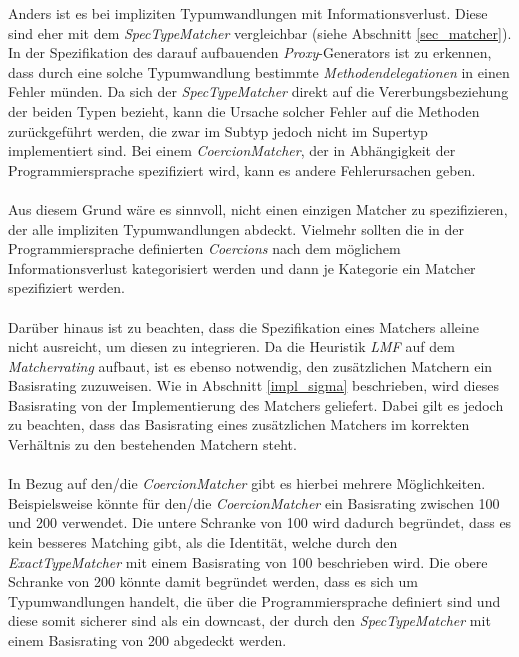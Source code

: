 Anders ist es bei impliziten Typumwandlungen mit Informationsverlust. Diese sind eher mit dem \emph{SpecTypeMatcher} vergleichbar (siehe Abschnitt \ref{sec_matcher}). In der Spezifikation des darauf aufbauenden \emph{Proxy}-Generators ist zu erkennen, dass durch eine solche Typumwandlung bestimmte \emph{Methodendelegationen} in einen Fehler münden. Da sich der \emph{SpecTypeMatcher} direkt auf die Vererbungsbeziehung der beiden Typen bezieht, kann die Ursache solcher Fehler auf die Methoden zurückgeführt werden, die zwar im Subtyp jedoch nicht im Supertyp implementiert sind. Bei einem \emph{CoercionMatcher}, der in Abhängigkeit der Programmiersprache spezifiziert wird, kann es andere Fehlerursachen geben.
\\\\
Aus diesem Grund wäre es sinnvoll, nicht einen einzigen Matcher zu spezifizieren, der alle impliziten Typumwandlungen abdeckt. Vielmehr sollten die in der Programmiersprache definierten \emph{Coercions} nach dem möglichem Informationsverlust kategorisiert werden und dann je Kategorie ein Matcher spezifiziert werden.
\\\\
Darüber hinaus ist zu beachten, dass die Spezifikation eines Matchers alleine nicht ausreicht, um diesen zu integrieren. Da die \Gls{Heuristik} \emph{LMF} auf dem \emph{Matcherrating} aufbaut, ist es ebenso notwendig, den zusätzlichen Matchern ein Basisrating zuzuweisen. Wie in Abschnitt \ref{impl_sigma} beschrieben, wird dieses Basisrating von der Implementierung des Matchers geliefert. Dabei gilt es jedoch zu beachten, dass das Basisrating eines zusätzlichen Matchers im korrekten Verhältnis zu den bestehenden Matchern steht.
\\\\
In Bezug auf den/die \emph{CoercionMatcher} gibt es hierbei mehrere Möglichkeiten. Beispielsweise könnte für den/die \emph{CoercionMatcher} ein Basisrating zwischen 100 und 200 verwendet. Die untere Schranke von 100 wird dadurch begründet, dass es kein besseres Matching gibt, als die Identität, welche durch den \emph{ExactTypeMatcher} mit einem Basisrating von 100 beschrieben wird. Die obere Schranke von 200 könnte damit begründet werden, dass es sich um Typumwandlungen handelt, die über die Programmiersprache definiert sind und diese somit sicherer sind als ein \Gls{downcast}, der durch den \emph{SpecTypeMatcher} mit einem Basisrating von 200 abgedeckt werden.
